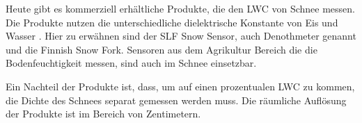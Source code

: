 

Heute gibt es kommerziell erhältliche Produkte, die den LWC von Schnee messen. Die Produkte nutzen die unterschiedliche dielektrische Konstante von Eis und Wasser . Hier zu erwähnen sind der SLF Snow Sensor, auch Denothmeter genannt und die Finnish Snow Fork. Sensoren aus dem Agrikultur Bereich die die Bodenfeuchtigkeit messen, sind auch im Schnee einsetzbar.

Ein Nachteil der Produkte ist, dass, um auf einen prozentualen LWC zu kommen, die Dichte des Schnees separat gemessen werden muss. Die räumliche Auflösung der Produkte ist im Bereich von Zentimetern.
